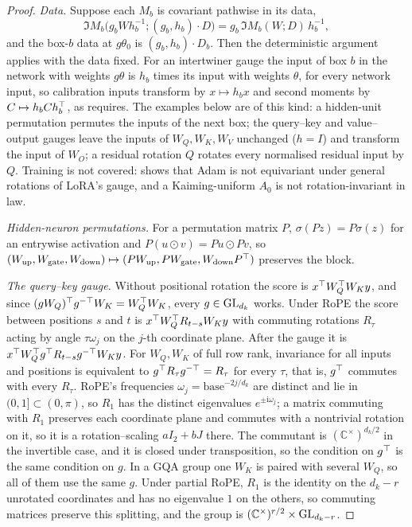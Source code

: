 \begin{proof}
\emph{Data.} Suppose each $M_b$ is covariant pathwise in its data,
\begin{equation*}
  \Im M_b\big(g_bWh_b^{-1};(g_b,h_b)\cdot D\big)=g_b\,\Im M_b(W;D)\,h_b^{-1},
\end{equation*}
and the box-$b$ data at $g\theta_0$ is $(g_b,h_b)\cdot D_b$. Then the deterministic argument applies with the data fixed. For an
intertwiner gauge the input of box $b$ in the network with weights $g\theta$ is $h_b$ times its input with weights $\theta$, for
every network input, so calibration inputs transform by $x\mapsto h_bx$ and second moments by $C\mapsto h_bCh_b^{\top}$, as
 requires. The examples below are of this kind: a hidden-unit permutation permutes the inputs of the
next box; the query--key and value--output gauges leave the inputs of $W_Q,W_K,W_V$ unchanged ($h=I$) and transform the input of
$W_O$; a residual rotation $Q$ rotates every normalised residual input by $Q$. Training is not covered: 
shows that Adam is not equivariant under general rotations of LoRA's gauge, and a Kaiming-uniform $A_0$ is not
rotation-invariant in law.

\emph{Hidden-neuron permutations.} For a permutation matrix $P$, $\sigma(Pz)=P\sigma(z)$ for an entrywise activation and
$P(u\odot v)=Pu\odot Pv$, so $(W_{\mathrm{up}},W_{\mathrm{gate}},W_{\mathrm{down}})\mapsto(PW_{\mathrm{up}},PW_{\mathrm{gate}},
W_{\mathrm{down}}P^{\top})$ preserves the block.

\emph{The query--key gauge.} Without positional rotation the score is $x^{\top} W_Q^{\top} W_Ky$, and since
$(gW_Q)^{\top} g^{-\top}W_K=W_Q^{\top} W_K$, every $g\in\mathrm{GL}_{d_k}$ works. Under RoPE the score between positions $s$ and $t$ is
$x^{\top} W_Q^{\top} R_{t-s}W_Ky$ with commuting rotations $R_\tau$ acting by angle $\tau\omega_j$ on the $j$-th coordinate plane. After
the gauge it is $x^{\top} W_Q^{\top} g^{\top} R_{t-s}g^{-\top}W_Ky$. For $W_Q,W_K$ of full row rank, invariance for all inputs and positions
is equivalent to $g^{\top} R_\tau g^{-\top}=R_\tau$ for every $\tau$, that is, $g^{\top}$ commutes with every $R_\tau$. RoPE's frequencies
$\omega_j=\mathrm{base}^{-2j/d_k}$ are distinct and lie in $(0,1]\subset(0,\pi)$, so $R_1$ has the distinct eigenvalues
$e^{\pm\mathrm i\omega_j}$; a matrix commuting with $R_1$ preserves each coordinate plane and commutes with a nontrivial rotation
on it, so it is a rotation--scaling $a I_2+bJ$ there. The commutant is $(\mathbb C^\times)^{d_k/2}$ in the invertible case, and
it is closed under transposition, so the condition on $g^{\top}$ is the same condition on $g$. In a GQA group one $W_K$ is paired with
several $W_Q$, so all of them use the same $g$. Under partial RoPE, $R_1$ is the identity on the $d_k-r$ unrotated coordinates and
has no eigenvalue $1$ on the others, so commuting matrices preserve this splitting, and the group is
$(\mathbb C^\times)^{r/2}\times\mathrm{GL}_{d_k-r}$.


\end{proof}
